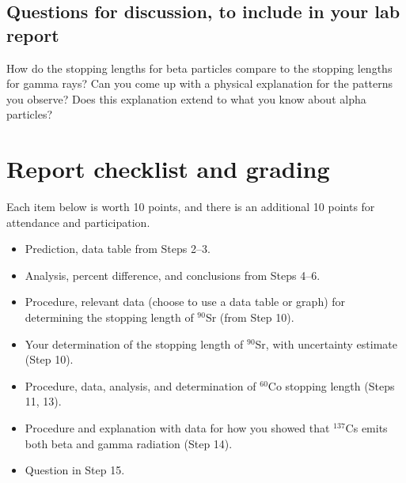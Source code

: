 \subsection{Questions for discussion, to include in your lab report}

\begin{steps}

	\item How do the stopping lengths for beta particles compare to the stopping lengths for gamma rays? Can you come up with a physical explanation for the patterns you observe? Does this explanation extend to what you know about alpha particles?
	
\end{steps}

\section{Report checklist and grading}

Each item below is worth 10 points, and there is an additional 10 points for attendance and participation.

\begin{itemize}
	\item Prediction, data table from Steps 2--3.
	
	\item Analysis, percent difference, and conclusions from Steps 4--6.
	
	\item Procedure, relevant data (choose to use a data table or graph) for determining the stopping length of $^{90}$Sr (from Step 10).
	
	\item Your determination of the stopping length of $^{90}$Sr, with uncertainty estimate (Step 10).
	
	\item Procedure, data, analysis, and determination of $^{60}$Co stopping length (Steps 11, 13).
	
	\item Procedure and explanation with data for how you showed that $^{137}$Cs emits both beta and gamma radiation (Step 14).
	
	\item Question in Step 15.
\end{itemize}